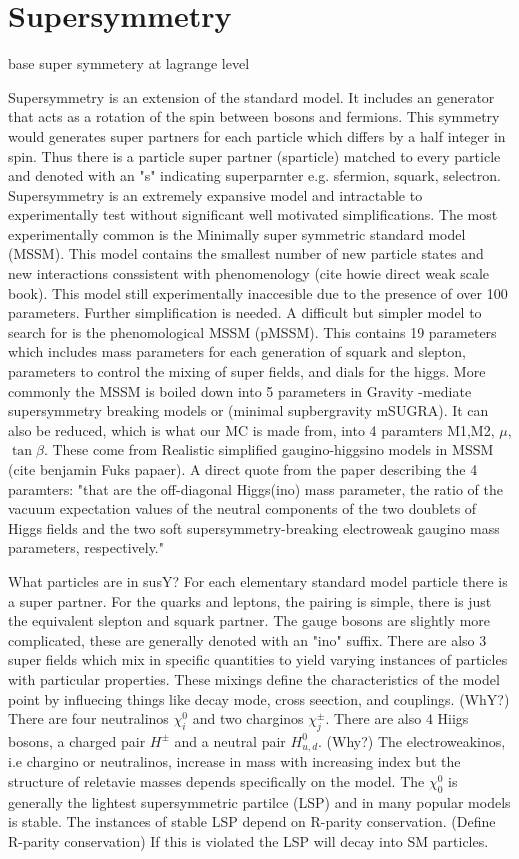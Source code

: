 \section{Supersymmetry}

base super symmetery at lagrange level

Supersymmetry is an extension of the standard model. It includes an generator that acts as a rotation of the spin between bosons and fermions. This symmetry would generates super partners for each particle which differs by a half integer in spin. Thus there is a particle super partner (sparticle) matched to every particle and denoted with an "s" indicating superparnter e.g. sfermion, squark, selectron. Supersymmetry is an extremely expansive model and intractable to experimentally test without significant well motivated simplifications. The most experimentally common is the Minimally super symmetric standard model (MSSM). This model contains the smallest number of new particle states and new interactions conssistent with phenomenology (cite howie direct weak scale book). This model still experimentally inaccesible due to the presence of over 100 parameters. Further simplification is needed. A difficult but simpler model to search for is the phenomological MSSM (pMSSM). This contains 19 parameters which includes mass parameters for each generation of squark and slepton, parameters to control the mixing of super fields, and dials for the higgs.  More commonly the MSSM is boiled down into 5 parameters in Gravity -mediate supersymmetry breaking models or (minimal supbergravity mSUGRA). It can also be reduced, which is what our MC is made from, into 4 paramters M1,M2, $\mu$, $\tan\beta$. These come from Realistic simplified gaugino-higgsino models in MSSM (cite benjamin Fuks papaer). A direct quote from the paper describing the 4 paramters: "that are the off-diagonal Higgs(ino) mass parameter, the ratio of the vacuum expectation values of the neutral components of the two doublets of Higgs fields and the two soft
supersymmetry-breaking electroweak gaugino mass parameters, respectively."

What particles are in susY?
For each elementary standard model particle there is a super partner. For the quarks and leptons, the pairing is simple, there is just the equivalent slepton and squark partner. The gauge bosons are slightly more complicated, these are generally denoted with an "ino" suffix. There are also 3 super fields which mix in specific quantities to yield varying instances of particles with particular properties. These mixings define the characteristics of the model point by influecing things like decay mode, cross seection, and couplings.  (WhY?) There are four neutralinos $\chi^0_i$ and two charginos $\chi^\pm_j$. There are also 4 Hiigs bosons, a charged pair $H^\pm$ and a neutral pair $H^0_{u,d}$. (Why?)  The electroweakinos, i.e chargino or neutralinos, increase in mass with increasing index but the structure of reletavie masses depends specifically on the model. The $\chi^0_0$ is generally the lightest supersymmetric partilce (LSP) and in many popular models is stable. The instances of stable LSP depend on R-parity conservation. (Define R-parity conservation) If this is violated the LSP will decay into SM particles.



